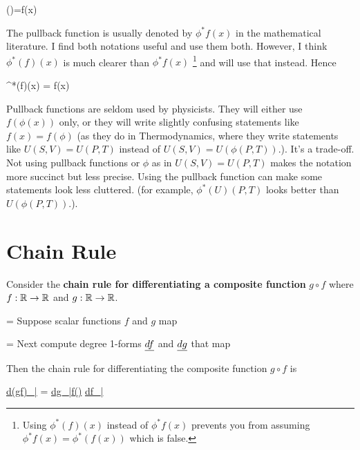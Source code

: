 \beq
{}(\phi)=f\circ\phi(x)
\eeq


The pullback function is usually denoted by
 $\phi^*f(x)$ in the mathematical literature.
I find both notations useful
and use them both. However, 
I think $\phi^*(f)(x)$
is much clearer than $\phi^*f(x)$ \footnote{Using $\phi^*(f)(x)$ instead of $\phi^*f(x)$ prevents you from assuming $\phi^*f(x)=\phi^*(f(x))$ which is false.}
and will use that instead. Hence

\beq
\phi^*(f)(x) =
f\circ \phi(x)
\eeq



Pullback functions
are seldom used by physicists.
They will either use $f(\phi(x))$ only,
or they will
write slightly confusing statements like
$f(x)= f(\phi)$ (as they do in Thermodynamics, where they
write statements like $U(S, V)= U(P, T)$
instead of $U(S, V)= U(\phi(P, T))$.\quad).
It's a trade-off. Not using pullback functions or $\phi$ as in $U(S, V)= U(P, T)$ makes
the notation
more succinct but less precise. Using the pullback
function can make some
statements look less cluttered. (for example, $\phi^*(U)(P, T)$ looks better than $U(\phi(P, T))$.\;).


\section{Chain Rule}
\label{sec-chain-rule}


Consider the {\bf chain
rule for differentiating 
a composite function} $g\circ f$ where
$f:{ \mathbb{R}}\rightarrow { \mathbb{R}}$
and $g:{ \mathbb{R}}\rightarrow { \mathbb{R}}$.

\beq
{}=
\eeq
Suppose scalar functions
$f$ and $g$ map 


\beq
{}
\eeq

\beq
{}=
\eeq
Next compute degree 1-forms  $\ul{df}$
and $\ul{dg}$ that map

\beq
{}
\eeq

\beq
{}
\eeq
Then 
the chain rule
for differentiating
the composite function $g\circ f$ is

\beq
\boxed
{\ul{d(g\circ f)_{|\pi}}
=
\ul{dg_{|f(\pi)}}
\circ \ul{df_{|\pi}}}
\label{eq-chain-rule-basic}
\eeq

